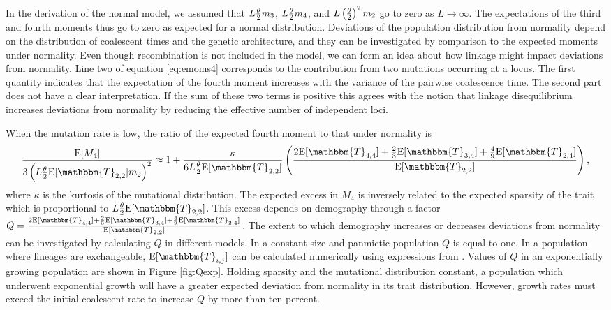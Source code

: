 
In the derivation of the normal model, we assumed that $L\frac{\theta}{2} m_3$, $L \frac{\theta}{2} m_4$,
and $L \left( \frac{\theta}{2} \right)^2 m_2$ go to zero as $L\to \infty$. The expectations of
the third and fourth moments thus go to zero as expected for a normal
distribution. Deviations of the population distribution from normality depend on
the distribution of coalescent times and the genetic architecture, and they can
be investigated by comparison to the expected moments under normality. Even
though recombination is not included in the model, we can form an idea about how
linkage might impact deviations from normality. Line two of
equation \eqref{eq:emoms4} corresponds to the contribution from two mutations
occurring at a locus. The first quantity indicates that the expectation of the
fourth moment increases with the variance of the pairwise coalescence time. The
second part does not have a clear interpretation. If the sum of these two terms
is positive this agrees with the notion that linkage disequilibrium increases
deviations from normality by reducing the effective number of independent loci.

When the mutation rate is low, the ratio of the expected fourth moment to that
under normality is
\begin{equation}
  \label{eq:popmom4coal}
  \frac{\E[M_4]}{3\left(L \T \E[\mathbbm{T}_{2,2}] m_2\right)^2} \approx 1 +
  \frac{\kappa}{6 L \T \E[\mathbbm{T}_{2,2}]}\left( \frac{2\E[\mathbbm{T}_{4,4}] +
      \frac{2}{3}\E[\mathbbm{T}_{3,4}] +
      \frac{4}{9}\E[\mathbbm{T}_{2,4}]}{\E[\mathbbm{T}_{2,2}]}\right),
\end{equation}
where $\kappa$ is the kurtosis of the mutational distribution. The expected
excess in $M_4$ is inversely related to the expected sparsity of the trait which
is proportional to $L \T \E[\mathbbm{T}_{2,2}]$. This excess depends on
demography through a factor $Q = \frac{2\E[\mathbbm{T}_{4,4}] +
  \frac{2}{3}\E[\mathbbm{T}_{3,4}] +
  \frac{4}{9}\E[\mathbbm{T}_{2,4}]}{\E[\mathbbm{T}_{2,2}]}$. The extent to which
demography increases or decreases deviations from normality can be investigated
by calculating $Q$ in different models. In a constant-size and panmictic
population $Q$ is equal to one. In a population where lineages are exchangeable,
$\E[\mathbbm{T}_{i,j}]$ can be calculated numerically using expressions from
\citet{Griffiths1998}. Values of $Q$ in an exponentially growing population are
shown in Figure \ref{fig:Qexp}. Holding sparsity and the mutational distribution
constant, a population which underwent exponential growth will have a greater
expected deviation from normality in its trait distribution. However, growth
rates must exceed the initial coalescent rate to increase $Q$ by more than ten
percent.

